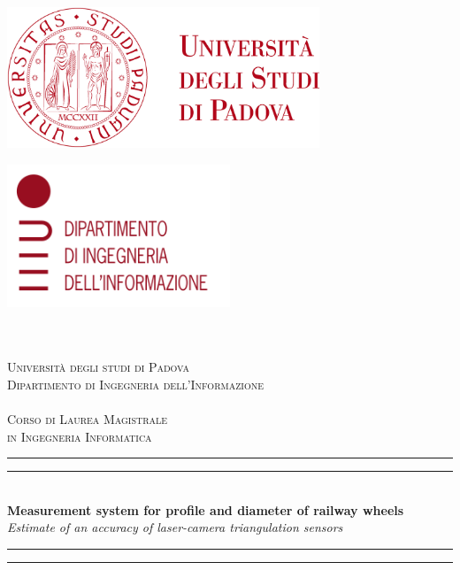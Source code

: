 \begin{center}
  \begin{minipage}[t]{0.45\textwidth}
    \flushleft
    \includegraphics[width=0.7\textwidth]{./images/logo_unipd.png}
  \end{minipage}
  \hfill
  \begin{minipage}[t]{0.45\textwidth}
    \flushright
    \includegraphics[width=0.5\textwidth]{./images/logo_dei.png}
  \end{minipage}\\~\\
  
  \textsc{ \LARGE{Università degli studi di Padova} \\
    \large{Dipartimento di Ingegneria dell'Informazione} \\~\\
    \Large{Corso di Laurea Magistrale \\ in Ingegneria Informatica} \\
  }
  \vspace*{\fill}
  
  \rule[0.4ex]{\linewidth}{2pt}\vspace*{-\baselineskip}\vspace*{3.2pt}
  \rule[0.4ex]{\linewidth}{1pt}\\[\baselineskip]
    \huge{\textbf{Measurement system for profile and diameter of railway wheels}}\\[4mm]
    \Large{\textit{Estimate of an accuracy of laser-camera triangulation sensors}}\\[\baselineskip]
  \rule[0.4ex]{\linewidth}{1pt}\vspace*{-\baselineskip}\vspace*{3.2pt}
  \rule[0.4ex]{\linewidth}{2pt}\\[\baselineskip]
  \vspace*{\fill}


\end{center}
